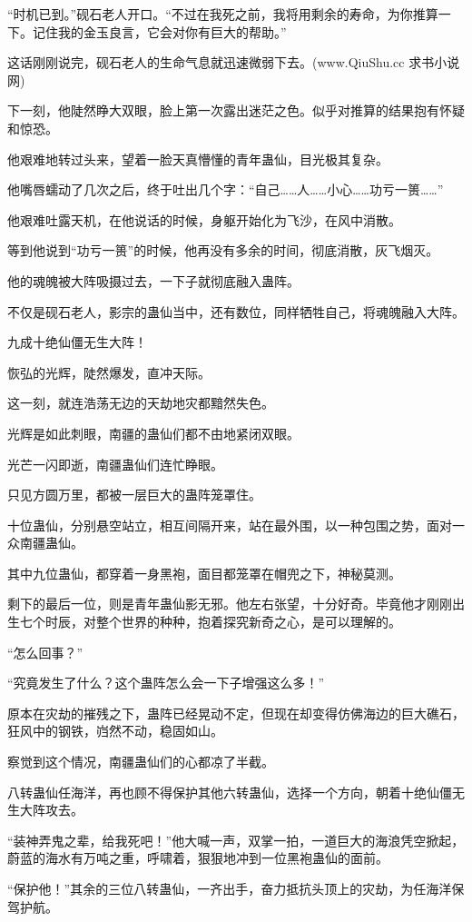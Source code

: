 \begin{this_body}
“时机已到。”砚石老人开口。“不过在我死之前，我将用剩余的寿命，为你推算一下。记住我的金玉良言，它会对你有巨大的帮助。”

这话刚刚说完，砚石老人的生命气息就迅速微弱下去。(www.QiuShu.cc 求书小说网)

下一刻，他陡然睁大双眼，脸上第一次露出迷茫之色。似乎对推算的结果抱有怀疑和惊恐。

他艰难地转过头来，望着一脸天真懵懂的青年蛊仙，目光极其复杂。

他嘴唇蠕动了几次之后，终于吐出几个字：“自己……人……小心……功亏一篑……”

他艰难吐露天机，在他说话的时候，身躯开始化为飞沙，在风中消散。

等到他说到“功亏一篑”的时候，他再没有多余的时间，彻底消散，灰飞烟灭。

他的魂魄被大阵吸摄过去，一下子就彻底融入蛊阵。

不仅是砚石老人，影宗的蛊仙当中，还有数位，同样牺牲自己，将魂魄融入大阵。

九成十绝仙僵无生大阵！

恢弘的光辉，陡然爆发，直冲天际。

这一刻，就连浩荡无边的天劫地灾都黯然失色。

光辉是如此刺眼，南疆的蛊仙们都不由地紧闭双眼。

光芒一闪即逝，南疆蛊仙们连忙睁眼。

只见方圆万里，都被一层巨大的蛊阵笼罩住。

十位蛊仙，分别悬空站立，相互间隔开来，站在最外围，以一种包围之势，面对一众南疆蛊仙。

其中九位蛊仙，都穿着一身黑袍，面目都笼罩在帽兜之下，神秘莫测。

剩下的最后一位，则是青年蛊仙影无邪。他左右张望，十分好奇。毕竟他才刚刚出生七个时辰，对整个世界的种种，抱着探究新奇之心，是可以理解的。

“怎么回事？”

“究竟发生了什么？这个蛊阵怎么会一下子增强这么多！”

原本在灾劫的摧残之下，蛊阵已经晃动不定，但现在却变得仿佛海边的巨大礁石，狂风中的钢铁，岿然不动，稳固如山。

察觉到这个情况，南疆蛊仙们的心都凉了半截。

八转蛊仙任海洋，再也顾不得保护其他六转蛊仙，选择一个方向，朝着十绝仙僵无生大阵攻去。

“装神弄鬼之辈，给我死吧！”他大喊一声，双掌一拍，一道巨大的海浪凭空掀起，蔚蓝的海水有万吨之重，呼啸着，狠狠地冲到一位黑袍蛊仙的面前。

“保护他！”其余的三位八转蛊仙，一齐出手，奋力抵抗头顶上的灾劫，为任海洋保驾护航。


\end{this_body}
